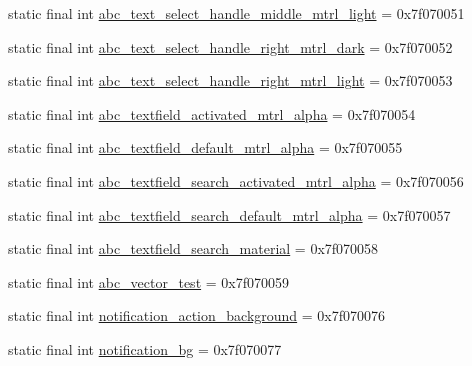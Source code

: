 \begin{DoxyCompactItemize}
\item 
static final int \mbox{\hyperlink{classcom_1_1synnapps_1_1carouselview_1_1_r_1_1drawable_a3238c8aace269358b4d5669270598344}{abc\+\_\+text\+\_\+select\+\_\+handle\+\_\+middle\+\_\+mtrl\+\_\+light}} = 0x7f070051
\item 
static final int \mbox{\hyperlink{classcom_1_1synnapps_1_1carouselview_1_1_r_1_1drawable_a0e1dd7d00307482853b3b3d4b368cbea}{abc\+\_\+text\+\_\+select\+\_\+handle\+\_\+right\+\_\+mtrl\+\_\+dark}} = 0x7f070052
\item 
static final int \mbox{\hyperlink{classcom_1_1synnapps_1_1carouselview_1_1_r_1_1drawable_a9395319a021bc8ea7a55903417c29950}{abc\+\_\+text\+\_\+select\+\_\+handle\+\_\+right\+\_\+mtrl\+\_\+light}} = 0x7f070053
\item 
static final int \mbox{\hyperlink{classcom_1_1synnapps_1_1carouselview_1_1_r_1_1drawable_ae5b8ca5e3d296c484f78e0928fd0c802}{abc\+\_\+textfield\+\_\+activated\+\_\+mtrl\+\_\+alpha}} = 0x7f070054
\item 
static final int \mbox{\hyperlink{classcom_1_1synnapps_1_1carouselview_1_1_r_1_1drawable_a04811e9f4ed6213e3fc7566fb9d28d44}{abc\+\_\+textfield\+\_\+default\+\_\+mtrl\+\_\+alpha}} = 0x7f070055
\item 
static final int \mbox{\hyperlink{classcom_1_1synnapps_1_1carouselview_1_1_r_1_1drawable_a51e9a390f969d58dc822a3a6497794ee}{abc\+\_\+textfield\+\_\+search\+\_\+activated\+\_\+mtrl\+\_\+alpha}} = 0x7f070056
\item 
static final int \mbox{\hyperlink{classcom_1_1synnapps_1_1carouselview_1_1_r_1_1drawable_aa735818134d731e5d0e0b5b7431ed841}{abc\+\_\+textfield\+\_\+search\+\_\+default\+\_\+mtrl\+\_\+alpha}} = 0x7f070057
\item 
static final int \mbox{\hyperlink{classcom_1_1synnapps_1_1carouselview_1_1_r_1_1drawable_a22d099392e5eb789695be2c9176891ae}{abc\+\_\+textfield\+\_\+search\+\_\+material}} = 0x7f070058
\item 
static final int \mbox{\hyperlink{classcom_1_1synnapps_1_1carouselview_1_1_r_1_1drawable_a74b30a0c41818011fb293f00c33d71d4}{abc\+\_\+vector\+\_\+test}} = 0x7f070059
\item 
static final int \mbox{\hyperlink{classcom_1_1synnapps_1_1carouselview_1_1_r_1_1drawable_aadd973bad547cc66d88b1f0e802ff8ce}{notification\+\_\+action\+\_\+background}} = 0x7f070076
\item 
static final int \mbox{\hyperlink{classcom_1_1synnapps_1_1carouselview_1_1_r_1_1drawable_aca617795dd7294dd36b32d6d46896764}{notification\+\_\+bg}} = 0x7f070077

\end{DoxyCompactItemize}
